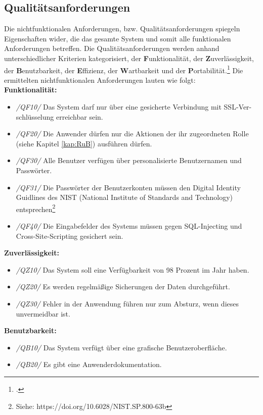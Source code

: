 \subsection{Qualitätsanforderungen}
Die nichtfunktionalen Anforderungen, bzw. Qualitätsanforderungen spiegeln Eigenschaften wider, die das gesamte System und somit alle funktionalen Anforderungen betreffen. Die Qualitätsanforderungen werden anhand unterschiedlicher Kriterien kategorisiert, der \textbf{F}unktionalität, der \textbf{Z}uverlässigkeit, der \textbf{B}enutzbarkeit, der \textbf{E}ffizienz, der \textbf{W}artbarkeit und der \textbf{P}ortabilität.\footcite[Vgl.][S. 494 f.]{balzert} Die ermittelten nichtfunktionalen Anforderungen lauten wie folgt:
\vspace{0.5cm}
\\\textbf{Funktionalität:}
\begin{itemize}
    \item[] \emph{/QF10/} Das System darf nur über eine gesicherte Verbindung mit SSL-Ver-schlüsselung erreichbar sein.
    \item[] \emph{/QF20/} Die Anwender dürfen nur die Aktionen der ihr zugeordneten Rolle (siehe Kapitel \ref{kap:RuB}) ausführen dürfen.
    \item[] \emph{/QF30/} Alle Benutzer verfügen über personalisierte Benutzernamen und Passwörter.
    \item[] \emph{/QF31/} Die Passwörter der Benutzerkonten müssen den \glqq{}Digital Identity Guidlines\grqq{} des NIST (National Institute of Standards and Technology) entsprechen\footnote{Siehe: https://doi.org/10.6028/NIST.SP.800-63b}
    \item[] \emph{/QF40/} Die Eingabefelder des Systems müssen gegen SQL-Injecting und Cross-Site-Scripting gesichert sein.
\end{itemize}
\vspace{0.5cm}
\textbf{Zuverlässigkeit:}
\begin{itemize}
    \item[] \emph{/QZ10/} Das System soll eine Verfügbarkeit von 98 Prozent im Jahr haben.
    \item[] \emph{/QZ20/} Es werden regelmäßige Sicherungen der Daten durchgeführt.
    \item[] \emph{/QZ30/} Fehler in der Anwendung führen nur zum Absturz, wenn dieses unvermeidbar ist.
\end{itemize}
\vspace{0.5cm}
\textbf{Benutzbarkeit:}
\begin{itemize}
    \item[] \emph{/QB10/} Das System verfügt über eine grafische Benutzeroberfläche.
    \item[] \emph{/QB20/} Es gibt eine Anwenderdokumentation.
\end{itemize}
